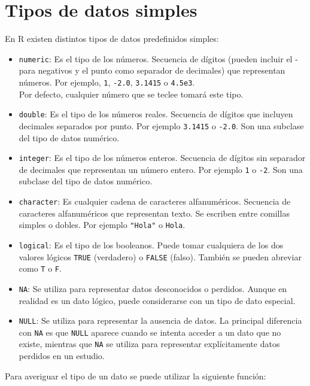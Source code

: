\documentclass[
]{book}
\theoremstyle{definition}
\theoremstyle{definition}
\theoremstyle{definition}
\theoremstyle{definition}
\theoremstyle{remark}
\begin{document}
\hypertarget{tipos-de-datos-simples}{%
\chapter{Tipos de datos simples}\label{tipos-de-datos-simples}}

En R existen distintos tipos de datos predefinidos simples:

\begin{itemize}
\item
  \texttt{numeric}: Es el tipo de los números. Secuencia de dígitos (pueden incluir el - para negativos y el punto como separador de decimales) que representan números. Por ejemplo, \texttt{1}, \texttt{-2.0}, \texttt{3.1415} o \texttt{4.5e3}.\\
  Por defecto, cualquier número que se teclee tomará este tipo.
\item
  \texttt{double}: Es el tipo de los números reales. Secuencia de dígitos que incluyen decimales separados por punto. Por ejemplo \texttt{3.1415} o \texttt{-2.0}. Son una subclase del tipo de datos numérico.
\item
  \texttt{integer}: Es el tipo de los números enteros. Secuencia de dígitos sin separador de decimales que representan un número entero. Por ejemplo \texttt{1} o \texttt{-2}. Son una subclase del tipo de datos numérico.
\item
  \texttt{character}: Es cualquier cadena de caracteres alfanuméricos. Secuencia de caracteres alfanuméricos que representan texto. Se escriben entre comillas simples o dobles. Por ejemplo \texttt{"Hola"} o \texttt{\textquotesingle{}Hola\textquotesingle{}}.
\item
  \texttt{logical}: Es el tipo de los booleanos. Puede tomar cualquiera de los dos valores lógicos \texttt{TRUE} (verdadero) o \texttt{FALSE} (falso). También se pueden abreviar como \texttt{T} o \texttt{F}.
\item
  \texttt{NA}: Se utiliza para representar datos desconocidos o perdidos. Aunque en realidad es un dato lógico, puede considerarse con un tipo de dato especial.
\item
  \texttt{NULL}: Se utiliza para representar la ausencia de datos. La principal diferencia con \texttt{NA} es que \texttt{NULL} aparece cuando se intenta acceder a un dato que no existe, mientras que \texttt{NA} se utiliza para representar explícitamente datos perdidos en un estudio.
\end{itemize}

Para averiguar el tipo de un dato se puede utilizar la siguiente función:
\end{document}
